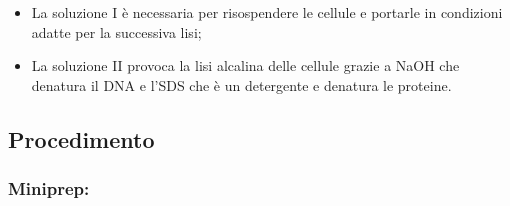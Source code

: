 \begin{itemize}
  \item La soluzione I è necessaria per risospendere le cellule e portarle in condizioni adatte per la successiva lisi;
  \item La soluzione II provoca la lisi alcalina delle cellule grazie a NaOH che denatura il DNA e l’SDS che è un detergente e denatura le proteine.
\end{itemize}

\subsection{Procedimento}

\subsubsection{Miniprep: }

